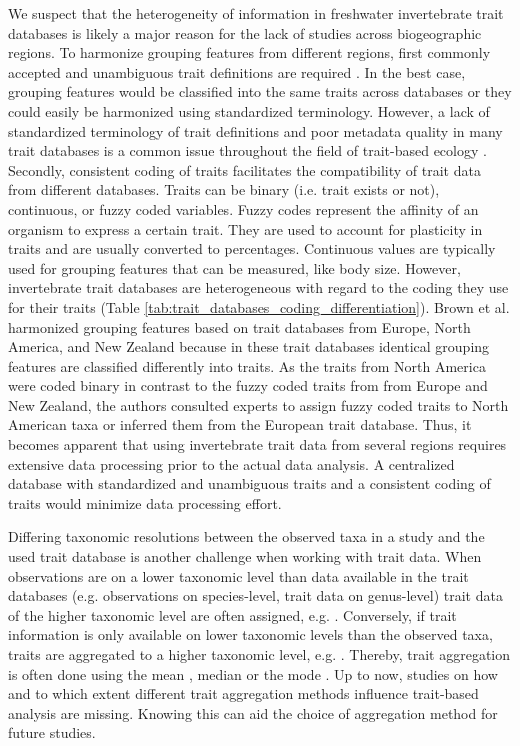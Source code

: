 \documentclass{article}
\begin{document}
We suspect that the heterogeneity of information in freshwater invertebrate trait databases is likely a major reason for the lack of studies across biogeographic regions. To harmonize grouping features from different regions, first commonly accepted and unambiguous trait definitions are required \cite{schneider_towards_2019}. In the best case, grouping features would be classified into the same traits across databases or they could easily be harmonized using standardized terminology. However, a lack of standardized terminology of trait definitions and poor metadata quality in many trait databases is a common issue throughout the field of trait-based ecology \cite{baird_toward_2011, schneider_towards_2019}. Secondly, consistent coding of traits facilitates the compatibility of trait data from different databases. Traits can be binary (i.e. trait exists or not), continuous, or fuzzy coded variables. Fuzzy codes represent the affinity of an organism to express a certain trait. They are used to account for plasticity in traits and are usually converted to percentages. Continuous values are typically used for grouping features that can be measured, like body size. However, invertebrate trait databases are heterogeneous with regard to the coding they use for their traits \cite{culp_incorporating_2011} (Table \ref{tab:trait_databases_coding_differentiation}). Brown et al. \cite{brown_functional_2018} harmonized grouping features based on trait databases from Europe, North America, and New Zealand because in these trait databases identical grouping features are classified differently into traits. As the traits from North America were coded binary in contrast to the fuzzy coded traits from from Europe and New Zealand, the authors consulted experts to assign fuzzy coded traits to North American taxa or inferred them from the European trait database. Thus, it becomes apparent that using invertebrate trait data from several regions requires extensive data processing prior to the actual data analysis. A centralized database with standardized and unambiguous traits and a consistent coding of traits would minimize data processing effort.

Differing taxonomic resolutions between the observed taxa in a study and the used trait database is another challenge when working with trait data. When observations are on a lower taxonomic level than data available in the trait databases (e.g. observations on species-level, trait data on genus-level) trait data of the higher taxonomic level are often assigned, e.g. \cite{szocs_effects_2014, vos_taxonomic_2017}. Conversely, if trait information is only available on lower taxonomic levels than the observed taxa, traits are aggregated to a higher taxonomic level, e.g. \cite{poff_functional_2006, szocs_effects_2014, piliere_a._f._h._importance_2016, aspin_extreme_2019}. Thereby, trait aggregation is often done using the mean \cite{magliozzi_functional_2019}, median \cite{szocs_effects_2014} or the mode \cite{piliere_a._f._h._importance_2016}. Up to now, studies on how and to which extent different trait aggregation methods influence trait-based analysis are missing. Knowing this can aid the choice of aggregation method for future studies.
\end{document}
